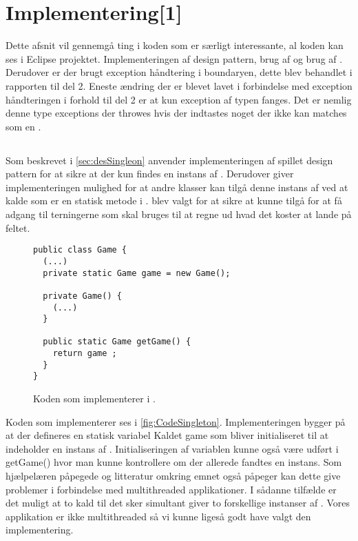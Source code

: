 \chapter{Implementering[1]}\label{chap:Implementering}
Dette afsnit vil gennemgå ting i koden som er særligt interessante, al koden kan ses i Eclipse projektet. Implementeringen af  design pattern, brug af  og brug af . Derudover er der brugt exception håndtering i boundaryen, dette blev behandlet i rapporten til del 2. Eneste ændring der er blevet lavet i forbindelse med exception håndteringen i forhold til del 2 er at kun exception af typen  fanges. Det er nemlig denne type exceptions der throwes hvis der indtastes noget der ikke kan matches som en . \cite{javaExceptionInputMismatchException}

\section{}
Som beskrevet i \vref{sec:desSingleon} anvender implementeringen af spillet  design pattern for at sikre at der kun findes en instans af . Derudover giver implementeringen mulighed for at andre klasser kan tilgå denne instans af  ved at kalde  som er en statisk metode i .  blev valgt for at sikre at  kunne tilgå  for at få adgang til terningerne som skal bruges til at regne ud hvad det koster at lande på feltet.

\begin{figure}
\caption{Koden som implementerer  i .}
\label{fig:CodeSingleton}
\centering
\begin{lstlisting}
public class Game {
  (...)
  private static Game game = new Game();

  private Game() {
    (...)
  }

  public static Game getGame() {
    return game ;
  }
}
\end{lstlisting}
\end{figure}

Koden som implementerer  ses i \vref{fig:CodeSingleton}. Implementeringen bygger på at der defineres en statisk variabel Kaldet game som bliver initialiseret til at indeholder en instans af . Initialiseringen af variablen kunne også være udført i getGame() hvor man kunne kontrollere om der allerede fandtes en instans. Som hjælpelæren påpegede og litteratur omkring emnet også påpeger kan dette give problemer i forbindelse med multithreaded applikationer. I sådanne tilfælde er det muligt at to kald til  det sker simultant giver to forskellige instanser af . Vores applikation er ikke multithreaded så vi kunne ligeså godt have valgt den implementering.

